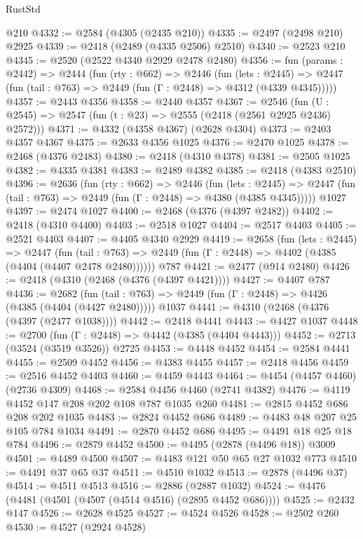\begin{lexlean}{RustStd}
\begin{coremodule}
    @210
@4332 := @2584 (@4305 (@2435 @210))
@4335 := @2497 (@2498 @210) @2925
@4339 := @2418 (@2489 (@4335 @2506) @2510)
@4340 := @2523 @210
@4345 := @2520 (@2522 @4340 @2929 @2478 @2480)
@4356 := fun (params : @2442) =>
  @2444
    (fun (rty : @662) =>
    @2446
      (fun (lets : @2445) =>
      @2447 (fun (tail : @763) => @2449 (fun (Γ : @2448) => @4312 (@4339 @4345)))))
@4357 := @2443 @4356
@4358 := @2440 @4357
@4367 := @2546 (fun (U : @2545) => @2547 (fun (t : @23) => @2555 (@2418 (@2561 @2925 @2436) @2572)))
@4371 := @4332 (@4358 @4367) (@2628 @4304)
@4373 := @2403 @4357 @4367
@4375 := @2633 @4356 @1025
@4376 := @2470 @1025
@4378 := @2468 (@4376 @2483)
@4380 := @2418 (@4310 @4378)
@4381 := @2505 @1025
@4382 := @4335 @4381
@4383 := @2489 @4382
@4385 := @2418 (@4383 @2510)
@4396 := @2636
    (fun (rty : @662) =>
    @2446
      (fun (lets : @2445) =>
      @2447 (fun (tail : @763) => @2449 (fun (Γ : @2448) => @4380 (@4385 @4345)))))
    @1027
@4397 := @2474 @1027
@4400 := @2468 (@4376 (@4397 @2482))
@4402 := @2418 (@4310 @4400)
@4403 := @2518 @1027
@4404 := @2517 @4403
@4405 := @2521 @4403
@4407 := @4405 @4340 @2929
@4419 := @2658
    (fun (lets : @2445) =>
    @2447
      (fun (tail : @763) => @2449 (fun (Γ : @2448) => @4402 (@4385 (@4404 (@4407 @2478 @2480))))))
    @787
@4421 := @2477 (@914 @2480)
@4426 := @2418 (@4310 (@2468 (@4376 (@4397 @4421))))
@4427 := @4407 @787
@4436 := @2682
    (fun (tail : @763) => @2449 (fun (Γ : @2448) => @4426 (@4385 (@4404 (@4427 @2480)))))
    @1037
@4441 := @4310 (@2468 (@4376 (@4397 (@2477 @1038))))
@4442 := @2418 @4441
@4443 := @4427 @1037
@4448 := @2700 (fun (Γ : @2448) => @4442 (@4385 (@4404 @4443)))
@4452 := @2713 (@3524 (@3519 @3526)) @2725
@4453 := @4448 @4452
@4454 := @2584 @4441
@4455 := @2509 @4452
@4456 := @4383 @4455
@4457 := @2418 @4456
@4459 := @2516 @4452 @4403
@4460 := @4459 @4443
@4464 := @4454 (@4457 @4460) (@2736 @4309)
@4468 := @2584 @4456 @4460 (@2741 @4382)
@4476 := @4119 @4452 @147 @208 @202 @108 @787 @1035 @260
@4481 := @2815 @4452 @686 @208 @202 @1035
@4483 := @2824 @4452 @686
@4489 := @4483 @48 @207 @25 @105 @784 @1034
@4491 := @2870 @4452 @686
@4495 := @4491 @18 @25 @18 @784
@4496 := @2879 @4452
@4500 := @4495 (@2878 (@4496 @18)) @3009
@4501 := @4489 @4500
@4507 := @4483 @121 @50 @65 @27 @1032 @773
@4510 := @4491 @37 @65 @37
@4511 := @4510 @1032
@4513 := @2878 (@4496 @37)
@4514 := @4511 @4513
@4516 := @2886 (@2887 @1032)
@4524 := @4476 (@4481 (@4501 (@4507 (@4514 @4516) (@2895 @4452 @686))))
@4525 := @2432 @147
@4526 := @2628 @4525
@4527 := @4524 @4526
@4528 := @2502 @260
@4530 := @4527 (@2924 @4528)

\end{coremodule}
\end{lexlean}
